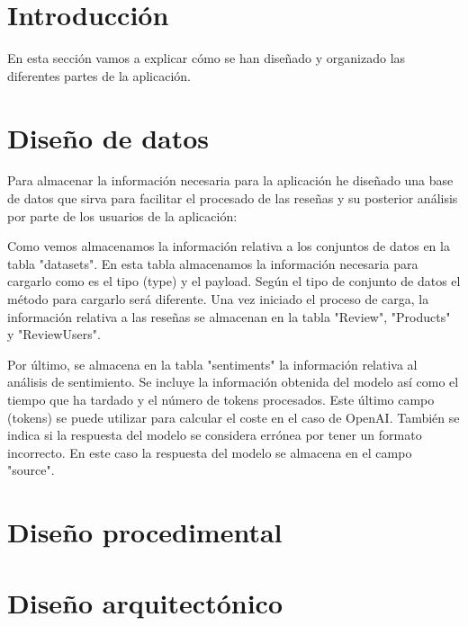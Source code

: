 
\section{Introducción}
En esta sección vamos a explicar cómo se han diseñado y organizado las diferentes partes de la aplicación.
\section{Diseño de datos}
Para almacenar la información necesaria para la aplicación he diseñado una base de datos 
que sirva para facilitar el procesado de las reseñas y su posterior análisis 
por parte de los usuarios de la aplicación:


Como vemos almacenamos la información relativa a los conjuntos de datos en la tabla "datasets".
En esta tabla almacenamos la información necesaria para cargarlo como es el tipo (type) y el payload.
Según el tipo de conjunto de datos el método para cargarlo será diferente.
Una vez iniciado el proceso de carga, la información relativa a las reseñas se almacenan en la tabla "Review", "Products" y "ReviewUsers".

Por último, se almacena en la tabla "sentiments" la información relativa al análisis de sentimiento.
Se incluye la información obtenida del modelo así como el tiempo que ha tardado y el número de tokens procesados.
Este último campo (tokens) se puede utilizar para calcular el coste en el caso de OpenAI.
También se indica si la respuesta del modelo se considera errónea por tener un formato incorrecto. 
En este caso la respuesta del modelo se almacena en el campo "source".

\newpage

\section{Diseño procedimental}


\newpage

\section{Diseño arquitectónico}

